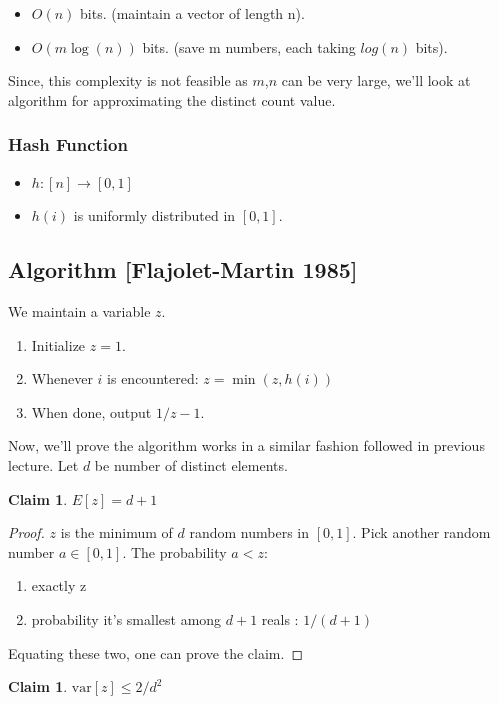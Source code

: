 \documentclass[11pt]{article}
\newtheorem{claim}[theorem]{Claim}
\begin{document}
\begin{itemize}
\item $O(n)$ bits. (maintain a vector of length n).
\item $O(m \log (n))$ bits. (save m numbers, each taking $log(n)$ bits).
\end{itemize}

Since, this complexity is not feasible as $m$,$n$ can be very large, we'll look at algorithm for approximating the distinct count value.

\subsubsection{Hash Function}
\begin{itemize}
\item $h : [n] \rightarrow [0,1]$
\item $h(i)$ is uniformly distributed in $[0,1]$.
\end{itemize}

\subsection{Algorithm [Flajolet-Martin 1985]}
We maintain a variable $z$.
\begin{enumerate}
\item Initialize $z = 1$.
\item Whenever $i$ is encountered: $z = \min{(z,h(i))}$
\item When done, output $1/z -1$.
\end{enumerate}

Now, we'll prove the algorithm works in a similar fashion followed in previous lecture.
Let $d$ be number of distinct elements.

\begin{claim}
$E[z] = d+1$
\end{claim}

\begin{proof}
$z$ is the minimum of $d$ random numbers in $[0,1]$. Pick another random number $a \in [0,1]$. The probability $a<z$:
\begin{enumerate}
\item exactly z
\item probability it's smallest among $d+1$ reals : $1/(d+1)$
\end{enumerate}
Equating these two, one can prove the claim.
\end{proof}

\begin{claim}
$\text{var}[z] \leq 2/d^{2}$
\end{claim}
\end{document}
